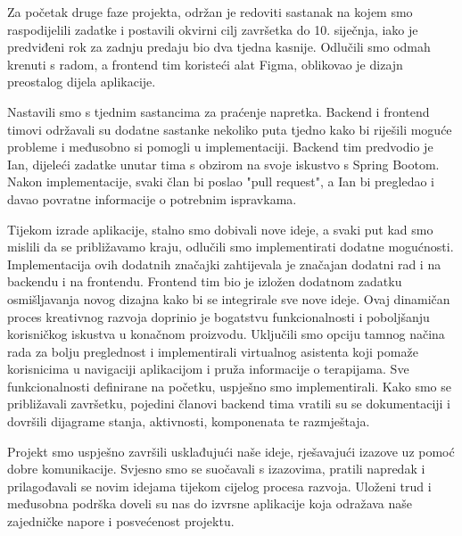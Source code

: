 Za početak druge faze projekta, održan je redoviti sastanak na kojem smo raspodijelili zadatke i postavili okvirni cilj završetka do 10. siječnja, iako je predviđeni rok za zadnju predaju bio dva tjedna kasnije. Odlučili smo odmah krenuti s radom, a frontend tim koristeći alat Figma, oblikovao je dizajn preostalog dijela aplikacije.

Nastavili smo s tjednim sastancima za praćenje napretka. Backend i frontend timovi održavali su dodatne sastanke nekoliko puta tjedno kako bi riješili moguće probleme i međusobno si pomogli u implementaciji. Backend tim predvodio je Ian, dijeleći zadatke unutar tima s obzirom na svoje iskustvo s Spring Bootom. Nakon implementacije, svaki član bi poslao "pull request", a Ian bi pregledao i davao povratne informacije o potrebnim ispravkama.

Tijekom izrade aplikacije, stalno smo dobivali nove ideje, a svaki put kad smo mislili da se približavamo kraju, odlučili smo implementirati dodatne mogućnosti. Implementacija ovih dodatnih značajki zahtijevala je značajan dodatni rad i na backendu i na frontendu. Frontend tim bio je izložen dodatnom zadatku osmišljavanja novog dizajna kako bi se integrirale sve nove ideje. Ovaj dinamičan proces kreativnog razvoja doprinio je bogatstvu funkcionalnosti i poboljšanju korisničkog iskustva u konačnom proizvodu. Uključili smo opciju  tamnog načina rada za bolju preglednost i implementirali virtualnog asistenta koji pomaže korisnicima u navigaciji aplikacijom i pruža informacije o terapijama. Sve funkcionalnosti definirane na početku, uspješno smo implementirali. Kako smo se približavali završetku, pojedini članovi backend tima vratili su se dokumentaciji i dovršili dijagrame stanja, aktivnosti, komponenata te razmještaja. 

Projekt smo uspješno završili usklađujući naše ideje, rješavajući izazove uz pomoć dobre komunikacije. Svjesno smo se suočavali s izazovima, pratili napredak i prilagođavali se novim idejama tijekom cijelog procesa razvoja. Uloženi trud i međusobna podrška doveli su nas do izvrsne aplikacije koja odražava naše zajedničke napore i posvećenost projektu. 